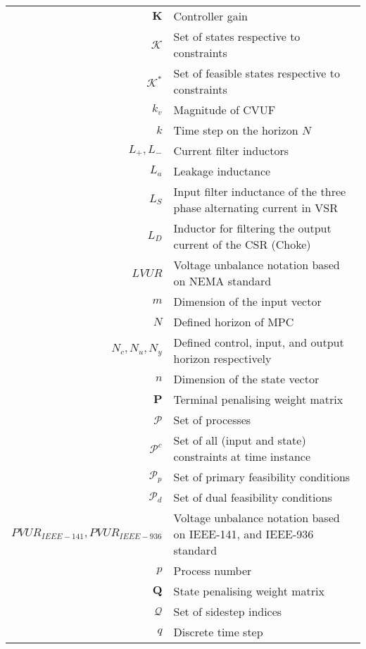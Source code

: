 \begin{scriptsize}
\begin{tabularx}{\textwidth}{r|X}
$\textbf{K}$                & Controller gain\\
$\mathcal{K}$               & Set of states respective to constraints\\
$\mathcal{K}^*$               & Set of feasible states respective to constraints\\
$k_v$  														& Magnitude of CVUF\\
$k$																& Time step on the horizon $N$ \\

$L_+,L_-$													& Current filter inductors\\
$L_a$															& Leakage inductance\\
$L_S$															& Input filter inductance of the three phase alternating current in VSR\\
$L_D$															& Inductor for filtering the output current of the CSR (Choke)\\
$LVUR$														& Voltage unbalance notation based on NEMA standard\\

$m$                             & Dimension of the input vector\\


$N$											& Defined horizon of MPC\\
$N_c,N_u,N_y$											& Defined control, input, and output horizon respectively\\
$n$                             & Dimension of the state vector\\


$\textbf{P}$                    & Terminal penalising weight matrix\\
$\mathcal{P}$                   & Set of processes\\
$\mathcal{P}^c$               & Set of all (input and state) constraints at time instance\\
$\mathcal{P}_p$             & Set of primary feasibility conditions\\
$\mathcal{P}_d$             & Set of dual feasibility conditions\\
$PVUR_{IEEE-141},PVUR_{IEEE-936}$	& Voltage unbalance notation based on IEEE-141, and IEEE-936 standard\\
$p$																& Process number\\

$\textbf{Q}$                    & State penalising weight matrix\\
$\mathcal{Q}$                   & Set of sidestep indices\\
$q$																& Discrete time step\\


\end{tabularx}
\end{scriptsize}
